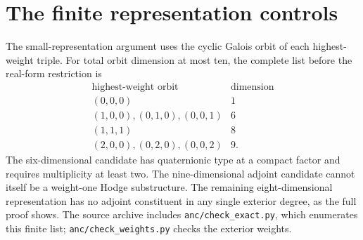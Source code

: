\section{The finite representation controls}\label{round26:app:carrier}
The small-representation argument uses the cyclic Galois orbit of each highest-weight triple. For total orbit dimension at most ten, the complete list before the real-form restriction is
\[
\begin{array}{c|c}
\text{highest-weight orbit}&\text{dimension}\\\hline
(0,0,0)&1\\
(1,0,0),(0,1,0),(0,0,1)&6\\
(1,1,1)&8\\
(2,0,0),(0,2,0),(0,0,2)&9.
\end{array}
\]
The six-dimensional candidate has quaternionic type at a compact factor and requires multiplicity at least two. The nine-dimensional adjoint candidate cannot itself be a weight-one Hodge substructure. The remaining eight-dimensional representation has no adjoint constituent in any single exterior degree, as the full proof shows. The source archive includes \texttt{anc/check\_exact.py}, which enumerates this finite list; \texttt{anc/check\_weights.py} checks the exterior weights.
